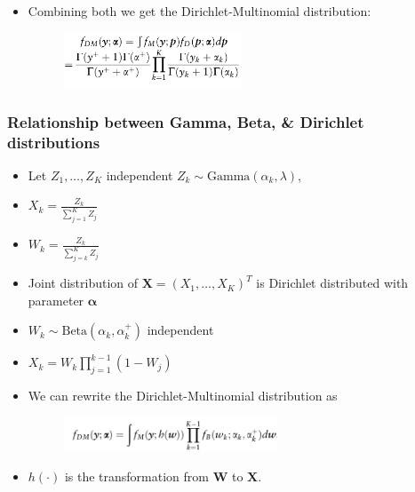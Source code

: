 \documentclass{beamer}
\begin{document}
\begin{frame}
\begin{itemize}
\item Combining both we get the Dirichlet-Multinomial distribution:
\begin{figure}[!htb]
  \centering
  \includegraphics[width=0.5\textwidth]{img/dm_pdf.png}

\end{figure}

\end{itemize}
\end{frame}

\begin{frame}
\frametitle{Relationship between Gamma, Beta, \& Dirichlet distributions}
\begin{itemize}
  \item Let $Z_1, \ldots , Z_K$ independent $Z_k \sim \text{Gamma}(\alpha_k, \lambda)$,
  \item $X_k = \frac{Z_k}{\sum_{j=1}^K Z_j}$
  \item $W_k = \frac{Z_k}{\sum_{j = k}^K Z_j}$
  \item Joint distribution of $\boldsymbol X = (X_1, \ldots , X_K)^T$ is Dirichlet distributed with parameter $\boldsymbol \alpha$
  \item $W_k \sim \text{Beta}(\alpha_k, \alpha_k^+)$ independent
  \item $X_k = W_k \prod_{j=1}^{k-1}(1 - W_j)$
  \item We can rewrite the Dirichlet-Multinomial distribution as
  \begin{figure}[!htb]
	\centering
	\includegraphics[width=0.6\textwidth]{img/dm_dist.png}
\end{figure}
\item $h(\cdot)$ is the transformation from $\boldsymbol W$ to $\boldsymbol X$.
\end{itemize}
\end{frame}
\end{document}
